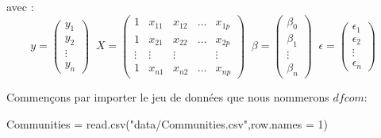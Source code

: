\documentclass[
]{book}
\newenvironment{Shaded}{\begin{snugshade}}{\end{snugshade}}
\newcommand{\AttributeTok}[1]{\textcolor[rgb]{0.77,0.63,0.00}{#1}}
\newcommand{\DecValTok}[1]{\textcolor[rgb]{0.00,0.00,0.81}{#1}}
\newcommand{\FunctionTok}[1]{\textcolor[rgb]{0.00,0.00,0.00}{#1}}
\newcommand{\NormalTok}[1]{#1}
\newcommand{\OtherTok}[1]{\textcolor[rgb]{0.56,0.35,0.01}{#1}}
\newcommand{\StringTok}[1]{\textcolor[rgb]{0.31,0.60,0.02}{#1}}
\begin{document}
avec :\\

\begin{equation}
y = \begin{pmatrix}y_1\\y_2\\\vdots\\y_n \end{pmatrix} \;\; 
X = \begin{pmatrix}
   1 & x_{11} & x_{12} & \dots &x_{1p}\\
   1 & x_{21} & x_{22} & \dots &x_{2p}\\
   \vdots &\vdots&\vdots & &\vdots\\
   1 & x_{n1} & x_{n2} & \dots &x_{np}
   \end{pmatrix} \;\;
\beta = \begin{pmatrix}\beta_0\\
   \beta_1\\
   \vdots\\
   \beta_n \end{pmatrix} \;\;
\epsilon = \begin{pmatrix}
   \epsilon_1\\
   \epsilon_2\\
   \vdots\\
   \epsilon_n \end{pmatrix} \;\;
\end{equation}

\hfill\break

Commençons par importer le jeu de données que nous nommerons \(dfcom\):\\

\begin{Shaded}
\begin{Highlighting}[]
\NormalTok{Communities }\OtherTok{=} \FunctionTok{read.csv}\NormalTok{(}\StringTok{"data/Communities.csv"}\NormalTok{,}\AttributeTok{row.names =} \DecValTok{1}\NormalTok{)}
\end{Highlighting}
\end{Shaded}
\end{document}

